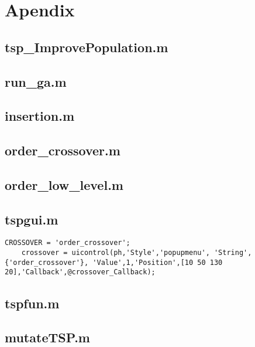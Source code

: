 

\section{Apendix}


\subsection{tsp\_ImprovePopulation.m}

\subsection{run\_ga.m}

\subsection{insertion.m}

\subsection{order\_crossover.m}

\subsection{order\_low\_level.m}

\subsection{tspgui.m}
    \begin{lstlisting}[frame=single]
    CROSSOVER = 'order_crossover';
    crossover = uicontrol(ph,'Style','popupmenu', 'String',{'order_crossover'}, 'Value',1,'Position',[10 50 130 20],'Callback',@crossover_Callback);
    \end{lstlisting}
\subsection{tspfun.m}

\subsection{mutateTSP.m}




